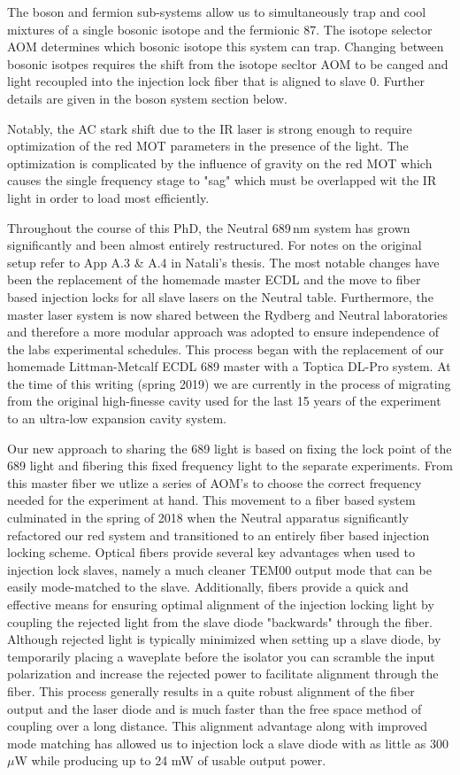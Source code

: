 The boson and fermion sub-systems allow us to simultaneously trap and cool mixtures of a single bosonic isotope and the fermionic 87.
The isotope selector AOM determines which bosonic isotope this system can trap.
Changing between bosonic isotpes requires the shift from the isotope secltor AOM to be canged and light recoupled into the injection lock fiber that is aligned to slave 0.
Further details are given in the boson system section below.

Notably, the AC stark shift due to the IR laser is strong enough to require optimization of the red MOT parameters in the presence of the light.
The optimization is complicated by the influence of gravity on the red MOT which causes the single frequency stage to "sag" which must be overlapped wit the IR light in order to load most efficiently.
	
Throughout the course of this PhD, the Neutral 689\,nm system has grown significantly and been almost entirely restructured. 
For notes on the original setup refer to App A.3 \& A.4 in Natali's thesis.
The most notable changes have been the replacement of the homemade master ECDL and the move to fiber based injection locks for all slave lasers on the Neutral table.
Furthermore, the master laser system is now shared between the Rydberg and Neutral laboratories and therefore a more modular approach was adopted to ensure independence of the labs experimental schedules. 
This process began with the replacement of our homemade Littman-Metcalf ECDL 689 master with a Toptica DL-Pro system. At the time of this writing (spring 2019) we are currently in the process of migrating from the original high-finesse cavity used for the last 15 years \cite{Nagel2004} of the experiment to an ultra-low expansion cavity system. 

Our new approach to sharing the 689 light is based on fixing the lock point of the 689 light and fibering this fixed frequency light to the separate experiments. 
From this master fiber we utlize a series of AOM's to choose the correct frequency needed for the experiment at hand. This movement to a fiber based system culminated in the spring of 2018 when the Neutral apparatus significantly refactored our red system and transitioned to an entirely fiber based injection locking scheme. 
Optical fibers provide several key advantages when used to injection lock slaves, namely a much cleaner TEM00 output mode that can be easily mode-matched to the slave. 
Additionally, fibers provide a quick and effective means for ensuring optimal alignment of the injection locking light by coupling the rejected light from the slave diode "backwards" through the fiber. 
Although rejected light is typically minimized when setting up a slave diode, by temporarily placing a waveplate before the isolator you can scramble the input polarization and increase the rejected power to facilitate alignment through the fiber. 
This process generally results in a quite robust alignment of the fiber output and the laser diode and is much faster than the free space method of coupling over a long distance. 
This alignment advantage along with improved mode matching has allowed us to injection lock a slave diode with as little as 300 $\mu$W while producing up to 24 mW of usable output power.

